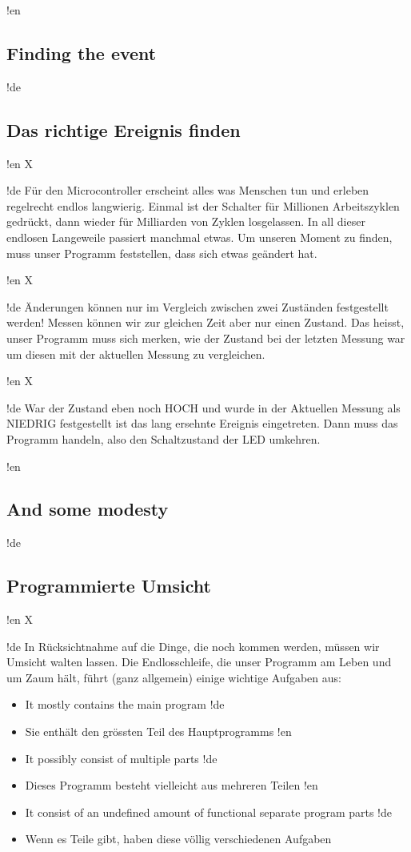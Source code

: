 !en \subsection{Finding the event}
!de \subsection{Das richtige Ereignis finden}



!en X

!de Für den Microcontroller erscheint alles was Menschen tun und erleben regelrecht endlos langwierig. Einmal ist der Schalter für Millionen Arbeitszyklen gedrückt, dann wieder für Milliarden von Zyklen losgelassen. In all dieser endlosen Langeweile passiert manchmal etwas. Um unseren Moment zu finden, muss unser Programm feststellen, dass sich etwas geändert hat.



!en X

!de Änderungen können nur im Vergleich zwischen zwei Zuständen festgestellt werden! Messen können wir zur gleichen Zeit aber nur einen Zustand. Das heisst, unser Programm muss sich merken, wie der Zustand bei der letzten Messung war um diesen mit der aktuellen Messung zu vergleichen.



!en X

!de War der Zustand eben noch HOCH und wurde in der Aktuellen Messung als NIEDRIG festgestellt ist das lang ersehnte Ereignis eingetreten. Dann muss das Programm handeln, also den Schaltzustand der LED umkehren.



!en \subsection{And some modesty}
!de \subsection{Programmierte Umsicht}


!en X

!de In Rücksichtnahme auf die Dinge, die noch kommen werden, müssen wir Umsicht walten lassen. Die Endlosschleife, die unser Programm am Leben und um Zaum hält, führt (ganz allgemein) einige wichtige Aufgaben aus:

\begin{itemize}
!en   \item It mostly contains the main program
!de   \item Sie enthält den grössten Teil des Hauptprogramms
!en   \item It possibly consist of multiple parts
!de   \item Dieses Programm besteht vielleicht aus mehreren Teilen
!en   \item It consist of an undefined amount of functional separate program parts
!de   \item Wenn es Teile gibt, haben diese völlig verschiedenen Aufgaben
\end{itemize}



